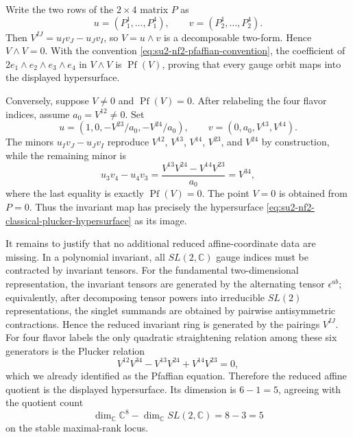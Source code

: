 Write the two rows of the \(2\times4\) matrix \(P\) as
\[
  u=(P_1^1,\ldots,P_1^4),\qquad
  v=(P_2^1,\ldots,P_2^4).
\]
Then \(V^{IJ}=u_Iv_J-u_Jv_I\), so \(V=u\wedge v\) is a decomposable two-form.
Hence \(V\wedge V=0\).  With the convention
\eqref{eq:su2-nf2-pfaffian-convention}, the coefficient of
\(2e_1\wedge e_2\wedge e_3\wedge e_4\) in \(V\wedge V\) is
\(\operatorname{Pf}(V)\), proving that every gauge orbit maps into the
displayed hypersurface.

Conversely, suppose \(V\neq0\) and \(\operatorname{Pf}(V)=0\).  After
relabeling the four flavor indices, assume \(a_0=V^{12}\neq0\).  Set
\[
  u=(1,0,-V^{23}/a_0,-V^{24}/a_0),
  \qquad
  v=(0,a_0,V^{13},V^{14}).
\]
The minors \(u_Iv_J-u_Jv_I\) reproduce \(V^{12}\), \(V^{13}\), \(V^{14}\),
\(V^{23}\), and \(V^{24}\) by construction, while the remaining minor is
\[
  u_3v_4-u_4v_3
  =
  \frac{V^{13}V^{24}-V^{14}V^{23}}{a_0}
  =
  V^{34},
\]
where the last equality is exactly \(\operatorname{Pf}(V)=0\).  The point
\(V=0\) is obtained from \(P=0\).  Thus the invariant map has precisely the
hypersurface \eqref{eq:su2-nf2-classical-plucker-hypersurface} as its image.

It remains to justify that no additional reduced affine-coordinate data are
missing.  In a polynomial invariant, all \(SL(2,\mathbb C)\) gauge indices
must be contracted by invariant tensors.  For the fundamental two-dimensional
representation, the invariant tensors are generated by the alternating tensor
\(\epsilon^{ab}\); equivalently, after decomposing tensor powers into
irreducible \(SL(2)\) representations, the singlet summands are obtained by
pairwise antisymmetric contractions.  Hence the reduced invariant ring is
generated by the pairings \(V^{IJ}\).  For four flavor labels the only
quadratic straightening relation among these six generators is the Plucker
relation
\[
  V^{12}V^{34}-V^{13}V^{24}+V^{14}V^{23}=0,
\]
which we already identified as the Pfaffian equation.  Therefore the reduced
affine quotient is the displayed hypersurface.  Its dimension is
\(6-1=5\), agreeing with the quotient count
\[
  \dim_{\mathbb C}\mathbb C^{8}-\dim_{\mathbb C}SL(2,\mathbb C)
  =
  8-3=5
\]
on the stable maximal-rank locus.

